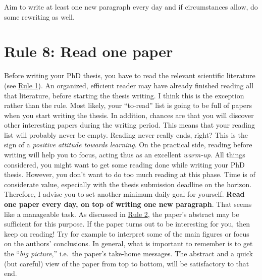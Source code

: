 \documentclass[
  12pt,
  oneside]{book}
\begin{document}
Aim to write at least one new paragraph every day and if circumstances allow, do some rewriting as well.

\hypertarget{rule8}{%
\section*{\texorpdfstring{\textbf{Rule 8:} Read one paper}{Rule 8: Read one paper}}\label{rule8}}

Before writing your PhD thesis, you have to read the relevant scientific literature (see \protect\hyperlink{rule1}{Rule 1}).
An organized, efficient reader may have already finished reading all that literature, before starting the thesis writing.
I think this is the exception rather than the rule.
Most likely, your ``to-read'' list is going to be full of papers when you start writing the thesis.
In addition, chances are that you will discover other interesting papers during the writing period.
This means that your reading list will probably never be empty.
Reading never really ends, right?
This is the sign of a \emph{positive attitude towards learning}.
On the practical side, reading before writing will help you to focus, acting thus as an excellent \emph{warm-up}.
All things considered, you might want to get some reading done while writing your PhD thesis.
However, you don't want to do too much reading at this phase.
Time is of considerate value, especially with the thesis submission deadline on the horizon.
Therefore, I advise you to set another minimum daily goal for yourself.
\textbf{Read one paper every day, on top of writing one new paragraph}.
That seems like a manageable task.
As discussed in \protect\hyperlink{rule2}{Rule 2}, the paper's abstract may be sufficient for this purpose.
If the paper turns out to be interesting for you, then keep on reading!
Try for example to interpret some of the main figures or focus on the authors' conclusions.
In general, what is important to remember is to get the ``\emph{big picture},'' i.e.~the paper's take-home messages.
The abstract and a quick (but careful) view of the paper from top to bottom, will be satisfactory to that end.
\end{document}
